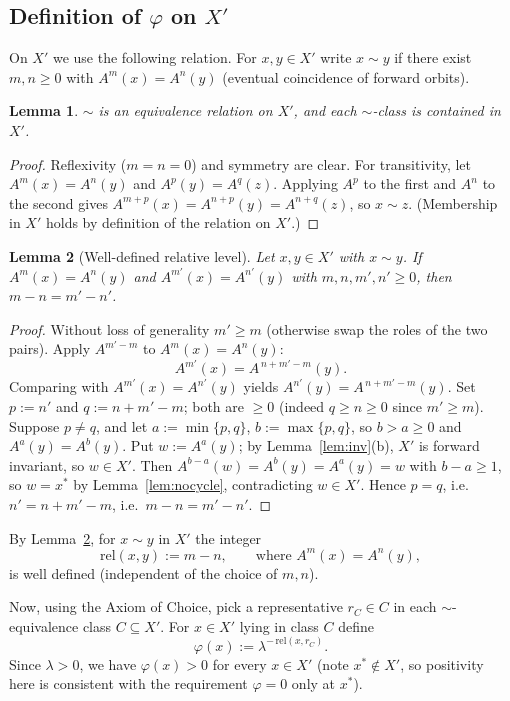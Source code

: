 \documentclass{amsart}
\newtheorem{lemma}{Lemma}
\theoremstyle{definition}
\begin{document}
\subsection*{Definition of $\varphi$ on $X'$}
On $X'$ we use the following relation. For $x,y\in X'$ write $x\sim y$ if there
exist $m,n\ge 0$ with $A^m(x)=A^n(y)$ (eventual coincidence of forward orbits).

\begin{lemma}\label{lem:equiv}
$\sim$ is an equivalence relation on $X'$, and each $\sim$-class is contained in
$X'$.
\end{lemma}
\begin{proof}
Reflexivity ($m=n=0$) and symmetry are clear. For transitivity, let
$A^{m}(x)=A^{n}(y)$ and $A^{p}(y)=A^{q}(z)$. Applying $A^{p}$ to the first and
$A^{n}$ to the second gives $A^{m+p}(x)=A^{n+p}(y)=A^{n+q}(z)$, so $x\sim z$.
(Membership in $X'$ holds by definition of the relation on $X'$.)
\end{proof}

\begin{lemma}[Well-defined relative level]\label{lem:delta}
Let $x,y\in X'$ with $x\sim y$. If $A^m(x)=A^n(y)$ and $A^{m'}(x)=A^{n'}(y)$ with
$m,n,m',n'\ge 0$, then $m-n=m'-n'$.
\end{lemma}
\begin{proof}
Without loss of generality $m'\ge m$ (otherwise swap the roles of the two pairs).
Apply $A^{m'-m}$ to $A^m(x)=A^n(y)$:
\[
  A^{m'}(x)=A^{\,n+m'-m}(y).
\]
Comparing with $A^{m'}(x)=A^{n'}(y)$ yields
$A^{n'}(y)=A^{\,n+m'-m}(y)$. Set $p:=n'$ and $q:=n+m'-m$; both are $\ge 0$ (indeed
$q\ge n\ge0$ since $m'\ge m$). Suppose $p\ne q$, and let $a:=\min\{p,q\}$,
$b:=\max\{p,q\}$, so $b>a\ge0$ and $A^{a}(y)=A^{b}(y)$. Put $w:=A^{a}(y)$; by
Lemma~\ref{lem:inv}(b), $X'$ is forward invariant, so $w\in X'$. Then
$A^{b-a}(w)=A^{b}(y)=A^{a}(y)=w$ with $b-a\ge 1$, so $w=x^*$ by
Lemma~\ref{lem:nocycle}, contradicting $w\in X'$. Hence
$p=q$, i.e.\ $n'=n+m'-m$, i.e.\ $m-n=m'-n'$.
\end{proof}

By Lemma~\ref{lem:delta}, for $x\sim y$ in $X'$ the integer
\begin{equation}\label{eq:rel}
  \mathrm{rel}(x,y):=m-n,\qquad\text{where }A^m(x)=A^n(y),
\end{equation}
is well defined (independent of the choice of $m,n$).

Now, using the Axiom of Choice, pick a representative $r_C\in C$ in each
$\sim$-equivalence class $C\subseteq X'$. For $x\in X'$ lying in class $C$ define
\begin{equation}\label{eq:phiXp}
  \varphi(x):=\lambda^{-\,\mathrm{rel}(x,r_C)} .
\end{equation}
Since $\lambda>0$, we have $\varphi(x)>0$ for every $x\in X'$ (note $x^*\notin
X'$, so positivity here is consistent with the requirement $\varphi=0$ only at
$x^*$).
\end{document}
